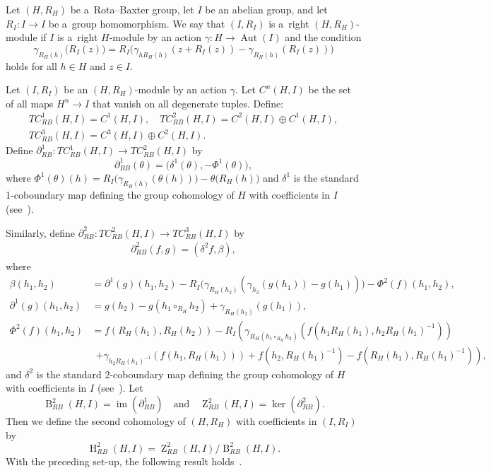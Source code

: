 \documentclass{jonasart}
\theoremstyle{plain}
\DeclareMathOperator{\Aut}{Aut}
\DeclareMathOperator{\B}{B}
\DeclareMathOperator{\Ho}{H}
\DeclareMathOperator{\im}{im}
\DeclareMathOperator{\Z}{Z}
\begin{document}
	\begin{definition}
		Let $(H, R_H )$ be a~Rota--Baxter group, let $I$ be an abelian group, and let $R_I: I \rightarrow I$ be a~group homomorphism. We say that $(I, R_I )$ is a~right $(H, R_H )$-module if $I$ is a~right $H$-module by an action $\gamma:H \rightarrow \Aut(I)$ and the condition
		\[
		\gamma_{R_H(h)} \big(R_I(z) \big)= R_I\big(\gamma_{ h R_H( h)}(z  +R_I(z))  -\gamma_{R_H(h)}(R_I(z))\big)
		\]
		holds for all $h \in H$ and $z \in I$.
	\end{definition}
	
	Let $(I, R_I )$ be an $(H, R_H)$-module by an action $\gamma$. Let $C^n (H, I)$ be the set of all maps $H^n \to I$ that vanish on all degenerate tuples. Define:
	\begin{gather*}
		TC^1_{RB}(H, I) = C^1 (H, I), \quad
		TC^2_{RB}(H, I) = C^2 (H, I) \oplus C^{1}(H, I), \\
		TC^3_{RB}(H, I)= C^3 (H, I) \oplus C^{2}(H, I).
	\end{gather*}
	Define $\partial^1_{RB}: TC^1_{RB}(H, I) \rightarrow TC^2_{RB}(H, I) $ by
	\[
	\partial^1_{RB}(\theta) = \big(\delta^1 (\theta),  -\Phi^1(\theta)\big),
	\]
	where $\Phi^1 (\theta)(h)=R_I \big( \gamma_{R_H (h)}(\theta(h)) \big) -\theta \big(R_H (h) \big)$ and $\delta^1$ is the standard 1-coboundary map defining the group cohomology of $H$ with coefficients in $I$ (see~\cite[Section 3.1]{MR0672956}).
	
	Similarly, define $\partial^2_{RB}: TC^2_{RB}(H, I) \rightarrow TC^3_{RB}(H, I)$ by
	\begin{align*}
		\partial^2_{RB}(f, g)=(\delta^2 f,\beta),
	\end{align*}
	where
	\begin{align*}
		\beta(h_1,h_2 )&=\partial^1 (g)(h_1,h_2 )-R_I\big(\gamma_{R_H (h_2 )}(\gamma_{h_2}(g(h_1 ))-g(h_1 ))\big)-\Phi^2 (f)(h_1,h_2 ),\\
		\partial^1 (g)(h_1,h_2 )&=g(h_2 )-g(h_1\circ_{R_H} h_2 )+\gamma_{R_H (h_2 )}(g(h_1 )),\\
		\Phi^2 (f)(h_1,h_2 )&=f(R_H (h_1 ),R_H (h_2 ))- R_I\left(\gamma_{R_H (h_1\circ_{R_H} h_2 )}(f(h_1 R_H (h_1 ),h_2 R_H (h_1 )^{-1}))\right.\\
		&\ \ \left.+\gamma_{h_2 R_H (h_1 )^{-1}}(f(h_1,R_H (h_1 )))+f(h_2,R_H (h_1 )^{-1})-f(R_H (h_1 ),R_H (h_1 )^{-1})\right),
	\end{align*}
	and $\delta^2$ is the standard 2-coboundary map defining the group cohomology of $H$ with coefficients in $I$ (see~\cite[Section 3.1]{MR0672956}). Let
	\[
	\B_{RB}^2(H, I) =  \im(\partial^1_{RB}) \quad \textrm{and}\quad \Z_{RB}^2(H, I) =  \ker(\partial^2_{RB}).
	\]
	Then we define the second cohomology of $(H, R_H )$ with coefficients in $(I, R_I )$ by
	\[
	\Ho^2_{RB}(H, I)=\Z_{RB}^2(H, I)/  \B^2_{RB}(H, I).
	\]
	With the preceding set-up, the following result holds~\cite[Theorem 4.4]{MR4644858}.
	
\end{document}
